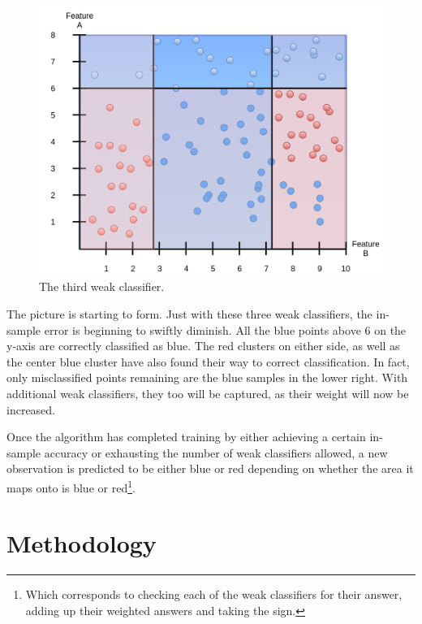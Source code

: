 \documentclass[a4paper, 12pt]{article}
\begin{document}
                    \begin{figure}[h]
                            \caption{The third weak classifier.}
                            \centering
                            \includegraphics[width=\textwidth]{boosting5}
                    \end{figure} 
                    
                    \par The picture is starting to form. Just with these three weak classifiers, the in-sample error is beginning to swiftly diminish. All the blue points above 6 on the y-axis are correctly classified as blue. The red clusters on either side, as well as the center blue cluster have also found their way to correct classification. In fact, only misclassified points remaining are the blue samples in the lower right. With additional weak classifiers, they too will be captured, as their weight will now be increased.
                    
                    \par Once the algorithm has completed training by either achieving a certain in-sample accuracy or exhausting the number of weak classifiers allowed, a new observation is predicted to be either blue or red depending on whether the area it maps onto is blue or red\footnote{Which corresponds to checking each of the weak classifiers for their answer, adding up their weighted answers and taking the sign.}.
                    
    \newpage

    \section{Methodology}
                    
\end{document}
